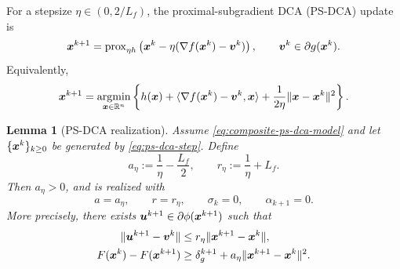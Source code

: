 \documentclass[english]{article}
\newtheorem{lemma}{Lemma}[section]
\begin{document}
For a stepsize $\eta\in(0,2/L_f)$, the proximal-subgradient DCA
(PS-DCA) update is
\begin{equation}
    \bm{x}^{k+1}
    =
    \mathrm{prox}_{\eta h}
    \left(
        \bm{x}^k-\eta(\nabla f(\bm{x}^k)-\bm{v}^k)
    \right),
    \qquad
    \bm{v}^k\in\partial g(\bm{x}^k).
    \label{eq:ps-dca-step}
\end{equation}
Equivalently,
\[
    \bm{x}^{k+1}
    =
    \operatorname*{\mathrm{argmin}}_{\bm{x}\in\mathbb{R}^n}
    \left\{
        h(\bm{x})
        +
        \langle \nabla f(\bm{x}^k)-\bm{v}^k,\bm{x}\rangle
        +
        \frac{1}{2\eta}\|\bm{x}-\bm{x}^k\|^2
    \right\}.
\]

\begin{lemma}[PS-DCA realization]
\label{lem:ps-dca-realization}
Assume \eqref{eq:composite-ps-dca-model} and let
$\{\bm{x}^k\}_{k\ge0}$ be generated by \eqref{eq:ps-dca-step}. Define
\[
    a_\eta:=\frac{1}{\eta}-\frac{L_f}{2},
    \qquad
    r_\eta:=\frac{1}{\eta}+L_f .
\]
Then $a_\eta>0$, and  is realized with
\[
    a=a_\eta,
    \qquad
    r=r_\eta,
    \qquad
    \sigma_k=0,
    \qquad
    \alpha_{k+1}=0 .
\]
More precisely, there exists
$\bm{u}^{k+1}\in\partial\phi(\bm{x}^{k+1})$ such that
\begin{align}
    \|\bm{u}^{k+1}-\bm{v}^k\|
    &\le
    r_\eta\|\bm{x}^{k+1}-\bm{x}^k\|,
    \label{eq:ps-dca-residual}
    \\
    F(\bm{x}^k)-F(\bm{x}^{k+1})
    &\ge
    \delta_g^{k+1}
    +
    a_\eta\|\bm{x}^{k+1}-\bm{x}^k\|^2 .
    \label{eq:ps-dca-descent}
\end{align}
\end{lemma}
\end{document}
